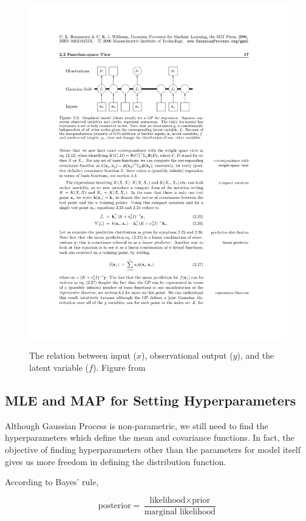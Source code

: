 \documentclass[11pt]{report}
\numberwithin{equation}{chapter}
\begin{document}
\begin{spacing}{2}
\begin{figure}[h]
\centering
\includegraphics[scale=1.0]{Regression_model.pdf}
\label{regression_model}
\caption{The relation between input ($x$), observational output ($y$), and the latent variable ($f$). \newline Figure from \cite{RW}}
\end{figure}


\subsection{MLE and MAP for Setting Hyperparameters}
Although Gaussian Process is non-parametric, we still need to find the hyperparameters which define the mean and covariance functions. In fact, the objective of finding hyperparameters other than the parameters for model itself gives us more freedom in defining the distribution function. 

According to Bayes' rule,

\[\mbox{posterior} = \frac{\mbox{likelihood}\times \mbox{prior}}{\mbox{marginal likelihood}}\]


\end{spacing}
\end{document}
